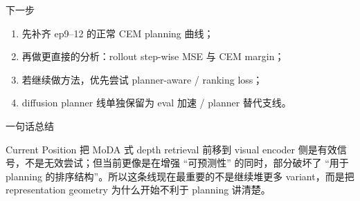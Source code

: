 \documentclass[aspectratio=169,11pt]{beamer}
\begin{document}
\begin{frame}{下一步}
  \begin{enumerate}
    \item 先补齐 ep9--12 的正常 CEM planning 曲线；
    \item 再做更直接的分析：rollout step-wise MSE 与 CEM margin；
    \item 若继续做方法，优先尝试 planner-aware / ranking loss；
    \item diffusion planner 线单独保留为 eval 加速 / planner 替代支线。
  \end{enumerate}
\end{frame}

\begin{frame}{一句话总结}
  \begin{block}{Current Position}
    把 MoDA 式 depth retrieval 前移到 visual encoder 侧是有效信号，不是无效尝试；但当前更像是在增强 ``可预测性'' 的同时，部分破坏了 ``用于 planning 的排序结构''。所以这条线现在最重要的不是继续堆更多 variant，而是把 representation geometry 为什么开始不利于 planning 讲清楚。
  \end{block}
\end{frame}
\end{document}
